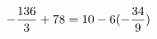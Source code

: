 \documentclass[preview]{standalone}
\begin{document}
\begin{align*}
\special{dvisvgm:raw <g id='unique000'>}- \frac{136}{3} + 78 = 10 - 6 (- \frac{34}{9})\special{dvisvgm:raw </g>}
\end{align*}
\end{document}
